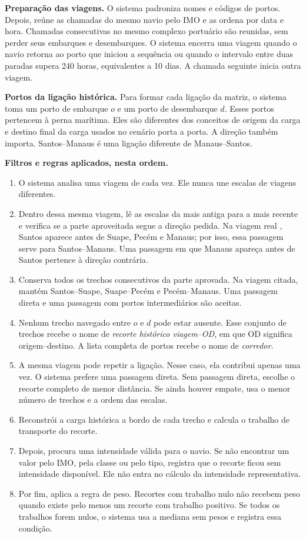 \textbf{Preparação das viagens.} O sistema padroniza nomes e códigos de portos. Depois, reúne as chamadas do mesmo navio pelo IMO e as ordena por data e hora. Chamadas consecutivas no mesmo complexo portuário são reunidas, sem perder seus embarques e desembarques. O sistema encerra uma viagem quando o navio retorna ao porto que iniciou a sequência ou quando o intervalo entre duas paradas supera 240 horas, equivalentes a 10 dias. A chamada seguinte inicia outra viagem.

\textbf{Portos da ligação histórica.} Para formar cada ligação da matriz, o sistema toma um porto de embarque \(o\) e um porto de desembarque \(d\). Esses portos pertencem à perna marítima. Eles são diferentes dos conceitos de origem da carga e destino final da carga usados no cenário porta a porta. A direção também importa. Santos--Manaus é uma ligação diferente de Manaus--Santos.

\textbf{Filtros e regras aplicados, nesta ordem.}

\begin{enumerate}
  \item O sistema analisa uma viagem de cada vez. Ele nunca une escalas de viagens diferentes.
  \item Dentro dessa mesma viagem, lê as escalas da mais antiga para a mais recente e verifica se a parte aproveitada segue a direção pedida. Na viagem real , Santos aparece antes de Suape, Pecém e Manaus; por isso, essa passagem serve para Santos--Manaus. Uma passagem em que Manaus apareça antes de Santos pertence à direção contrária.
  \item Conserva todos os trechos consecutivos da parte aprovada. Na viagem citada, mantém Santos--Suape, Suape--Pecém e Pecém--Manaus. Uma passagem direta e uma passagem com portos intermediários são aceitas.
  \item Nenhum trecho navegado entre \(o\) e \(d\) pode estar ausente. Esse conjunto de trechos recebe o nome de \emph{recorte histórico viagem--OD}, em que OD significa origem--destino. A lista completa de portos recebe o nome de \emph{corredor}.
  \item A mesma viagem pode repetir a ligação. Nesse caso, ela contribui apenas uma vez. O sistema prefere uma passagem direta. Sem passagem direta, escolhe o recorte completo de menor distância. Se ainda houver empate, usa o menor número de trechos e a ordem das escalas.
  \item Reconstrói a carga histórica a bordo de cada trecho e calcula o trabalho de transporte do recorte.
  \item Depois, procura uma intensidade válida para o navio. Se não encontrar um valor pelo IMO, pela classe ou pelo tipo, registra que o recorte ficou sem intensidade disponível. Ele não entra no cálculo da intensidade representativa.
  \item Por fim, aplica a regra de peso. Recortes com trabalho nulo não recebem peso quando existe pelo menos um recorte com trabalho positivo. Se todos os trabalhos forem nulos, o sistema usa a mediana sem pesos e registra essa condição.
\end{enumerate}

